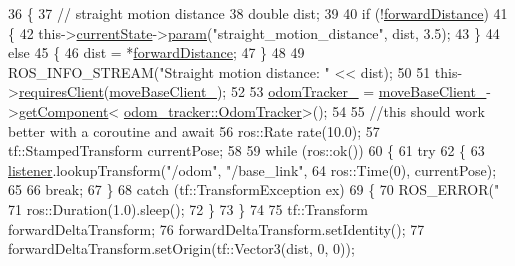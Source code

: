 \begin{DoxyCode}
36     \{
37         \textcolor{comment}{// straight motion distance}
38         \textcolor{keywordtype}{double} dist;
39 
40         \textcolor{keywordflow}{if} (!\hyperlink{classsm__dance__bot_1_1CbNavigateForward_af150b8fb72f2a27b6fef85b6f169b91b}{forwardDistance})
41         \{
42             this->\hyperlink{classsmacc_1_1SmaccClientBehavior_af76fc9b877542ed5caf033f820c107d0}{currentState}->\hyperlink{classsmacc_1_1ISmaccState_a4982f2187ed6da337462721146e8ef70}{param}(\textcolor{stringliteral}{"straight\_motion\_distance"}, dist, 3.5);
43         \}
44         \textcolor{keywordflow}{else}
45         \{
46             dist = *\hyperlink{classsm__dance__bot_1_1CbNavigateForward_af150b8fb72f2a27b6fef85b6f169b91b}{forwardDistance};
47         \}
48 
49         ROS\_INFO\_STREAM(\textcolor{stringliteral}{"Straight motion distance: "} << dist);
50 
51         this->\hyperlink{classsmacc_1_1SmaccClientBehavior_a917f001e763a1059af337bf4e164f542}{requiresClient}(\hyperlink{classsm__dance__bot_1_1CbNavigateForward_aa8925dbb246e8decc95e226818fa63ea}{moveBaseClient\_});
52 
53         \hyperlink{classsm__dance__bot_1_1CbNavigateForward_a203a34ea3c943646b29dde9756b1f595}{odomTracker\_} = \hyperlink{classsm__dance__bot_1_1CbNavigateForward_aa8925dbb246e8decc95e226818fa63ea}{moveBaseClient\_}->\hyperlink{classsmacc_1_1ISmaccClient_adef78db601749ca63c19e74a27cb88cc}{getComponent}<
      \hyperlink{classodom__tracker_1_1OdomTracker}{odom\_tracker::OdomTracker}>();
54 
55         \textcolor{comment}{//this should work better with a coroutine and await}
56         ros::Rate rate(10.0);
57         tf::StampedTransform currentPose;
58 
59         \textcolor{keywordflow}{while} (ros::ok())
60         \{
61             \textcolor{keywordflow}{try}
62             \{
63                 \hyperlink{classsm__dance__bot_1_1CbNavigateForward_a7bda457757f10a2e71eb15c07bf707b4}{listener}.lookupTransform(\textcolor{stringliteral}{"/odom"}, \textcolor{stringliteral}{"/base\_link"},
64                                          ros::Time(0), currentPose);
65 
66                 \textcolor{keywordflow}{break};
67             \}
68             \textcolor{keywordflow}{catch} (tf::TransformException ex)
69             \{
70                 ROS\_ERROR(\textcolor{stringliteral}{"%
71                 ros::Duration(1.0).sleep();
72             \}
73         \}
74 
75         tf::Transform forwardDeltaTransform;
76         forwardDeltaTransform.setIdentity();
77         forwardDeltaTransform.setOrigin(tf::Vector3(dist, 0, 0));
}
\end{DoxyCode}
